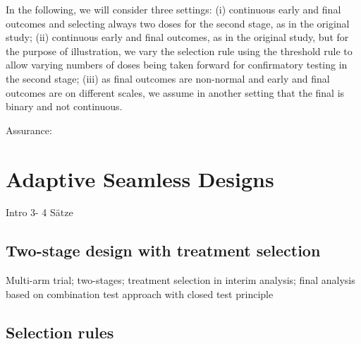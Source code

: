 \documentclass[bimj,fleqn]{w-art}
\theoremstyle{plain}
\theoremstyle{definition}
\begin{document}
In the following, we will consider three settings: %
(i) continuous early and final outcomes and selecting always two doses for the second stage, as in the original study; %
(ii) continuous early and final outcomes, as in the original study, but for the purpose of illustration, we vary the selection rule using the threshold rule to allow varying numbers of doses being taken forward for confirmatory testing in the second stage; %
(iii) as final outcomes are non-normal and early and final outcomes are on different scales, we assume in another setting that the final is binary and not continuous.%








Assurance: \cite{stallard_optimal_2009}

\section{Adaptive Seamless Designs}
\label{sec:adaptive_seamless_designs}

Intro 3- 4 Sätze

\subsection{Two-stage design with treatment selection}
\label{ssec:two_stage_design_with_treatment_selection}

Multi-arm trial; two-stages; treatment selection in interim analysis; final analysis based on combination test approach with closed test principle


\subsection{Selection rules}
\label{ssec:selection_rules}
\end{document}
